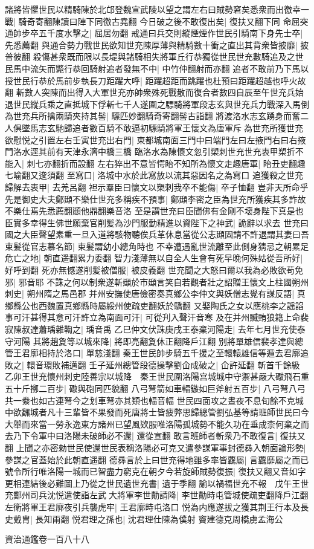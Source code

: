 諸將皆懼世民以精騎陳於北邙登魏宣武陵以望之謂左右曰賊勢窘矣悉衆而出徼幸一戰|{
	騎奇寄翻陳讀曰陣下同徼古堯翻}
今日破之後不敢復出矣|{
	復扶又翻下同}
命屈突通帥步卒五千度水擊之|{
	屈居勿翻}
戒通曰兵交則縱煙煙作世民引騎南下身先士卒|{
	先悉薦翻}
與通合勢力戰世民欲知世充陳厚薄與精騎數十衝之直出其背衆皆披靡|{
	披普彼翻}
殺傷甚衆既而限以長堤與諸騎相失將軍丘行恭獨從世民世充數騎追及之世民馬中流矢而斃行恭回騎射追者發無不中|{
	中竹仲翻射而亦翻}
追者不敢前乃下馬以授世民行恭於馬前步執長刀距躍大呼|{
	距躍超距而跳躍也杜預曰距躍超越也呼火故翻}
斬數人突陳而出得入大軍世充亦帥衆殊死戰散而復合者數四自辰至午世充兵始退世民縱兵乘之直抵城下俘斬七千人遂圍之驃騎將軍段志玄與世充兵力戰深入馬倒為世充兵所擒兩騎夾持其髻|{
	驃匹妙翻騎奇寄翻髻古詣翻}
將渡洛水志玄踴身而奮二人俱墜馬志玄馳歸追者數百騎不敢逼初驃騎將軍王懷文為唐軍斥為世充所獲世充欲慰悦之引置左右壬寅世充出右門|{
	東都城南面三門中曰端門左曰左掖門右曰右掖門洛水逕其前有天津永濟中橋三橋}
臨洛水為陳懷文忽引槊刺世充世充衷甲槊折不能入|{
	刺七亦翻折而設翻}
左右猝出不意皆愕眙不知所為懷文走趣唐軍|{
	眙丑吏翻趣七喻翻又逡須翻}
至寫口|{
	洛城中水於此寫放以流其惡因名之為寫口}
追獲殺之世充歸解去衷甲|{
	去羌呂翻}
袒示羣臣曰懷文以槊刺我卒不能傷|{
	卒子恤翻}
豈非天所命乎先是御史大夫鄭頲不樂仕世充多稱疾不預事|{
	鄭頲李密之臣為世充所獲疾其多詐故不樂仕焉先悉薦翻頲他鼎翻樂音洛}
至是謂世充曰臣聞佛有金剛不壞身陛下真是也臣實多幸得生佛世願棄官削髪為沙門服勤精進以資陛下之神武|{
	詭辭以求去}
世充曰國之大臣聲望素重一旦入道將駭物聽俟兵革休息當從公志頲固請不許退謂其妻曰吾束髪從官志慕名節|{
	束髪謂幼小總角時也}
不幸遭遇亂世流離至此側身猜忌之朝累足危亡之地|{
	朝直遥翻累力委翻}
智力淺薄無以自全人生會有死早晩何殊姑從吾所好|{
	好呼到翻}
死亦無憾遂削髪被僧服|{
	被皮義翻}
世充聞之大怒曰爾以我為必敗欲苟免邪|{
	邪音耶}
不誅之何以制衆遂斬頲於市頲言笑自若觀者壯之詔贈王懷文上柱國朔州刺史|{
	朔州隋之馬邑郡}
并州安撫使唐儉密奏真鄉公李仲文與妖僧志覺有謀反語|{
	真鄉縣公也西魏置真鄉縣時屬綏州使疏吏翻妖於驕翻}
又娶陶氏之女以應桃李之謡諂事可汗甚得其意可汗許立為南面可汗|{
	可從刋入聲汗音寒}
及在并州贓賄狼籍上命裴寂陳叔達蕭瑀雜鞫之|{
	瑀音禹}
乙巳仲文伏誅庚戌王泰棄河陽走|{
	去年七月世充使泰守河陽}
其將趙夐等以城來降|{
	將即亮翻夐休正翻降戶江翻}
别將單雄信裴孝達與總管王君廓相持於洛口|{
	單慈淺翻}
秦王世民帥步騎五千援之至轘轅雄信等遁去君廓追敗之|{
	轘音環敗補邁翻}
壬子延州總管段德操擊劉仚成破之|{
	仚許延翻}
斬首千餘級　乙卯王世充懷州刺史陸善宗以城降　秦王世民圍洛陽宫城城中守禦甚嚴大礮飛石重五十斤擲二百步|{
	礮與砲同匹貌翻}
八弓弩箭如車輻鏃如巨斧射五百步|{
	八弓弩八弓共一絭也如古連弩今之划車弩亦其類也輻音幅}
世民四面攻之晝夜不息旬餘不克城中欲飜城者凡十三輩皆不果發而死唐將士皆疲弊思歸總管劉弘基等請班師世民曰今大舉而來當一勞永逸東方諸州已望風欵服唯洛陽孤城勢不能久功在垂成柰何棄之而去乃下令軍中曰洛陽未破師必不還|{
	還從宣翻}
敢言班師者斬衆乃不敢復言|{
	復扶又翻}
上聞之亦密勑世民使還世民表稱洛陽必可克又遣參謀軍事封德彞入朝面論形勢|{
	參謀之官蓋始於此朝直遥翻}
德彞言於上曰世充得地雖多率皆覊屬|{
	言覊靡屬之而已}
號令所行唯洛陽一城而已智盡力窮克在朝夕今若旋師賊勢復振|{
	復扶又翻又音如字}
更相連結後必難圖上乃從之世民遺世充書|{
	遺于季翻}
諭以禍福世充不報　戊午王世充鄭州司兵沈悦遣使詣左武大將軍李世勣請降|{
	李世勣時屯管城使疏吏翻降戶江翻}
左衛將軍王君廓夜引兵襲虎牢|{
	王君廓時屯洛口}
悦為内應遂拔之獲其荆王行本及長史戴胄|{
	長知兩翻}
悦君理之孫也|{
	沈君理仕陳為僕射}
竇建德克周橋虜孟海公

資治通鑑卷一百八十八

